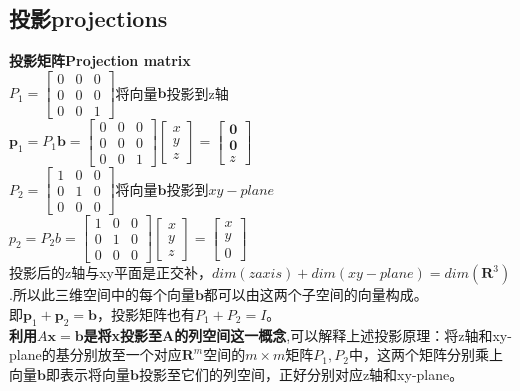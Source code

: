     \subsection{投影projections}
    \textbf{投影矩阵Projection matrix}\\
    $P_{1}=\left[\begin{array}{lll}{0} & {0} & {0} \\ {0} & {0} & {0} \\ {0} & {0} & {1}\end{array}\right]$\quad 将向量$\bm{b}$投影到z轴
    \\
    $\boldsymbol{p}_{1}=P_{1} \boldsymbol{b}=\left[\begin{array}{ccc}{0} & {0} & {0} \\ {0} & {0} & {0} \\ {0} & {0} & {1}\end{array}\right]\left[\begin{array}{l}{x} \\ {y} \\ {z}\end{array}\right]=\left[\begin{array}{l}{\mathbf{0}} \\ {\mathbf{0}} \\ {z}\end{array}\right]$
    \\
    $P_{2}=\left[\begin{array}{lll}{1} & {0} & {0} \\ {0} & {1} & {0} \\ {0} & {0} & {0}\end{array}\right]$\quad 将向量$\bm{b}$投影到$xy-plane$
    \\
    $p_{2}=P_{2} b=\left[\begin{array}{lll}{1} & {0} & {0} \\ {0} & {1} & {0} \\ {0} & {0} & {0}\end{array}\right]\left[\begin{array}{l}{x} \\ {y} \\ {z}\end{array}\right]=\left[\begin{array}{l}{x} \\ {y} \\ {0}\end{array}\right]$
    \\
    投影后的z轴与xy平面是正交补，$dim(z axis) + dim(xy-plane) = dim(\bm{R}^3)$.所以此三维空间中的每个向量$\bm{b}$都可以由这两个子空间的向量构成。
    \\
    即$\boldsymbol{p}_{1}+\boldsymbol{p}_{2}=\boldsymbol{b}$，投影矩阵也有$P_{1}+P_{2}=I$。
    \\
    \textbf{利用$A\bm{x}=\bm{b}$是将x投影至A的列空间这一概念},可以解释上述投影原理：将z轴和xy-plane的基分别放至一个对应$\bm{R}^m$空间的$m\times m$矩阵$P_1,P_2$中，这两个矩阵分别乘上向量$\bm{b}$即表示将向量$\bm{b}$投影至它们的列空间，正好分别对应z轴和xy-plane。
